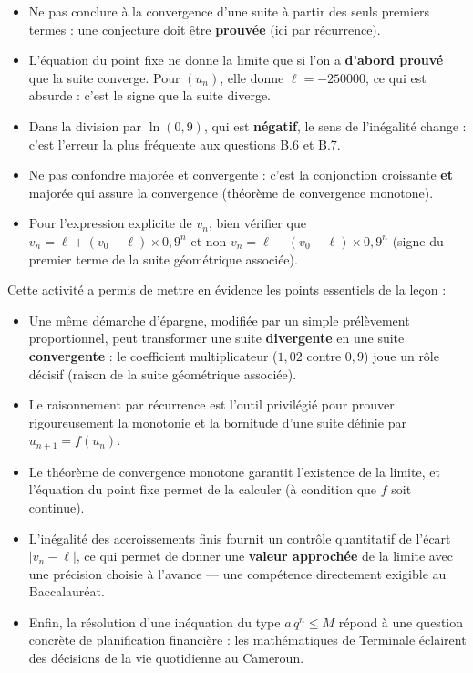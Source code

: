 \documentclass[11pt]{article}
\newcommand{\cle}[1]{{\popxbold\color{popdark}#1}}
\newcounter{popsec}
\newcounter{popsub}
\newcommand{\courssub}[1]{%
  \stepcounter{popsub}%
  \par\vspace{9pt}\noindent{\popxbold\fontsize{11.5}{13}\selectfont\color{popink}{\color{poporange}\thepopsec.\thepopsub}\hspace{6pt}#1}\par\nopagebreak\vspace{4pt}
}
\begin{document}
\begin{attention}
\begin{itemize}
\item Ne pas conclure à la convergence d'une suite à partir des seuls premiers termes : une conjecture doit être \textbf{prouvée} (ici par récurrence).
\item L'équation du point fixe ne donne la limite que si l'on a \textbf{d'abord prouvé} que la suite converge. Pour $(u_n)$, elle donne $\ell=-\num{250000}$, ce qui est absurde : c'est le signe que la suite diverge.
\item Dans la division par $\ln(0{,}9)$, qui est \textbf{négatif}, le sens de l'inégalité change : c'est l'erreur la plus fréquente aux questions B.6 et B.7.
\item Ne pas confondre \og majorée \fg{} et \og convergente \fg{} : c'est la conjonction \og croissante \textbf{et} majorée \fg{} qui assure la convergence (théorème de convergence monotone).
\item Pour l'expression explicite de $v_n$, bien vérifier que $v_n = \ell + (v_0-\ell)\times 0{,}9^n$ et non $v_n = \ell - (v_0-\ell)\times 0{,}9^n$ (signe du premier terme de la suite géométrique associée).
\end{itemize}
\end{attention}

\courssub{Bilan de l'activité}

Cette activité a permis de mettre en évidence les points essentiels de la leçon :

\begin{itemize}
\item Une même démarche d'épargne, modifiée par un simple prélèvement proportionnel, peut transformer une suite \textbf{divergente} en une suite \textbf{convergente} : le coefficient multiplicateur ($1{,}02$ contre $0{,}9$) joue un rôle décisif (raison de la suite géométrique associée).
\item Le \cle{raisonnement par récurrence} est l'outil privilégié pour prouver rigoureusement la monotonie et la bornitude d'une suite définie par $u_{n+1}=f(u_n)$.
\item Le \cle{théorème de convergence monotone} garantit l'existence de la limite, et l'\cle{équation du point fixe} permet de la calculer (à condition que $f$ soit continue).
\item L'\cle{inégalité des accroissements finis} fournit un contrôle quantitatif de l'écart $|v_n-\ell|$, ce qui permet de donner une \textbf{valeur approchée} de la limite avec une précision choisie à l'avance — une compétence directement exigible au Baccalauréat.
\item Enfin, la résolution d'une inéquation du type $a\,q^n \leq M$ répond à une question concrète de planification financière : les mathématiques de Terminale éclairent des décisions de la vie quotidienne au Cameroun.
\end{itemize}
\end{document}
